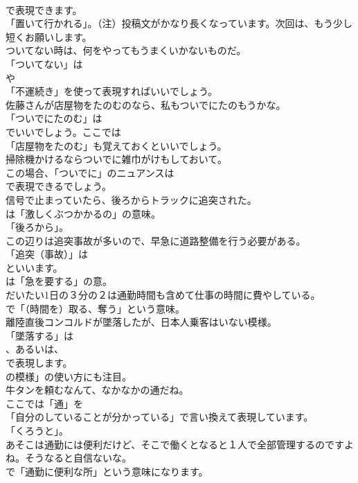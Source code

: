 \documentclass[8pt]{extreport}
\begin{document}
\begin{CJK}{UTF8}{min}
\\	で表現できます。
\\	「置いて行かれる」。（注）投稿文がかなり長くなっています。次回は、もう少し短くお願いします。	
\\	ついてない時は、何をやってもうまくいかないものだ。 
\\	「ついてない」は
\\	や
\\	「不運続き」を使って表現すればいいでしょう。	
\\	佐藤さんが店屋物をたのむのなら、私もついでにたのもうかな。 
\\	「ついでにたのむ」は
\\	でいいでしょう。ここでは
\\	「店屋物をたのむ」も覚えておくといいでしょう。	
\\	掃除機かけるならついでに雑巾がけもしておいて。 
\\	この場合、「ついでに」のニュアンスは 
\\	で表現できるでしょう。	
\\	信号で止まっていたら、後ろからトラックに追突された。 
\\	は「激しくぶつかかるの」の意味。
\\	「後ろから」。	
\\	この辺りは追突事故が多いので、早急に道路整備を行う必要がある。 
\\	「追突（事故）」は
\\	といいます。
\\	は「急を要する」の意。	
\\	だいたい1日の３分の２は通勤時間も含めて仕事の時間に費やしている。 
\\	で「（時間を）取る、奪う」という意味。	
\\	離陸直後コンコルドが墜落したが、日本人乗客はいない模様。 
\\	「墜落する」は
\\	、あるいは、
\\	で表現します。
\\	の模様」の使い方にも注目。	
\\	牛タンを頼むなんて、なかなかの通だね。 
\\	ここでは「通」を
\\	「自分のしていることが分かっている」で言い換えて表現しています。
\\	「くろうと」。	
\\	あそこは通勤には便利だけど、そこで働くとなると１人で全部管理するのですよね。そうなると自信ないな。 
\\	で「通勤に便利な所」という意味になります。

\end{CJK}
\end{document}
